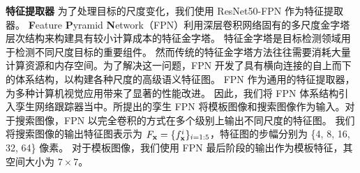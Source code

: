 \textbf{特征提取器} 为了处理目标的尺度变化，我们使用 ResNet50-FPN \cite{lin2017feature} 作为特征提取器。
\textbf{F}eature \textbf{P}yramid \textbf{N}etwork（FPN）利用深层卷积网络固有的多尺度金字塔层次结构来构建具有较小计算成本的特征金字塔。
特征金字塔是目标检测领域用于检测不同尺度目标的重要组件。
然而传统的特征金字塔方法往往需要消耗大量计算资源和内存空间。为了解决这一问题，FPN 
开发了具有横向连接的自上而下的体系结构，以构建各种尺度的高级语义特征图。
FPN 作为通用的特征提取器，为多种计算机视觉应用带来了显著的性能改进。
因此，我们将 FPN 体系结构引入孪生网络跟踪器当中。所提出的孪生 FPN 将模板图像和搜索图像作为输入。对于搜索图像，FPN 以完全卷积的方式在多个级别上输出不同尺度的特征图。
我们将搜索图像的输出特征图表示为 $F_{\textbf x} = \{f_{\textbf x}^i\}_{i=1:5}$，特征图的步幅分别为 \{4, 8, 16, 32, 64\} 像素。
对于模板图像，我们使用 FPN 最后阶段的输出作为模板特征，其空间大小为 $7 \times 7$。

